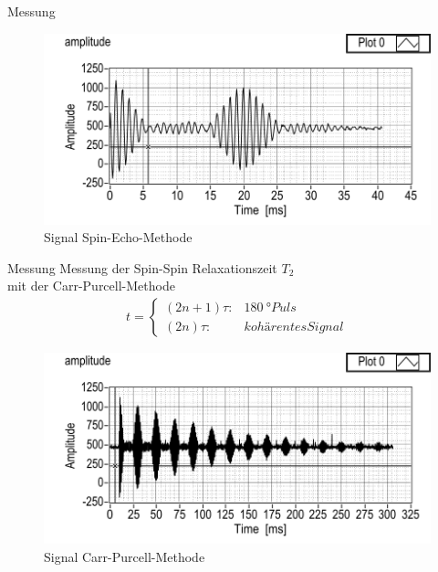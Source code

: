 \begin{frame}{Messung}
	\begin{figure}
	\centering
	\includegraphics[scale=.8]{images//pulse.png}
	\caption{Signal Spin-Echo-Methode \cite{script_nmr}}
	\end{figure}
\end{frame}

\begin{frame}{Messung}
Messung der Spin-Spin Relaxationszeit $T_2$\\mit der Carr-Purcell-Methode
	\begin{align*}
	t =\begin{cases*} (2n+1)\tau: & \SI{180}{\degree} Puls \\ (2n)\tau: & kohärentes Signal \end{cases*}
	\end{align*}
	\begin{figure}
	\centering
	\includegraphics[scale=.65]{images//carrpurcell.png}
	\caption{Signal Carr-Purcell-Methode \cite{script_nmr}}
	\end{figure}
\end{frame}

